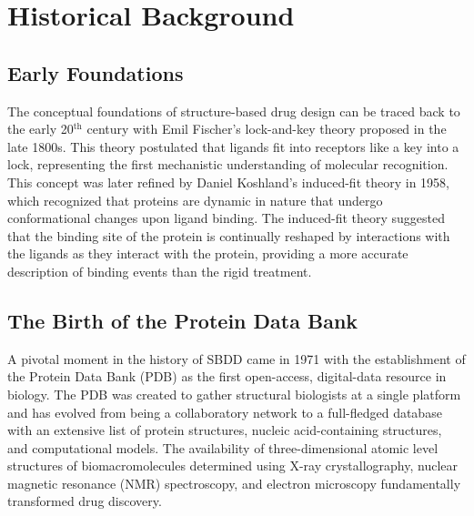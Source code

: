 \section{Historical Background}

\subsection{Early Foundations}
The conceptual foundations of structure-based drug design can be traced back to the early 20$^{\text{th}}$ century with Emil Fischer’s lock-and-key theory proposed in the late 1800s\cite{CH1_1}. This theory postulated that ligands fit into receptors like a key into a lock, representing the first mechanistic understanding of molecular recognition. This concept was later refined by Daniel Koshland’s induced-fit theory in 1958\cite{CH1_2}, which recognized that proteins are dynamic in nature that undergo conformational changes upon ligand binding. The induced-fit theory suggested that the binding site of the protein is continually reshaped by interactions with the ligands as they interact with the protein, providing a more accurate description of binding events than the rigid treatment.

\subsection{The Birth of the Protein Data Bank}
A pivotal moment in the history of SBDD came in 1971 with the establishment of the Protein Data Bank (PDB) as the first open-access, digital-data resource in biology\cite{CH1_3}. The PDB was created to gather structural biologists at a single platform and has evolved from being a collaboratory network to a full-fledged database with an extensive list of protein structures, nucleic acid-containing structures, and computational models. The availability of three-dimensional atomic level structures of biomacromolecules determined using X-ray crystallography, nuclear magnetic resonance (NMR) spectroscopy, and electron microscopy fundamentally transformed drug discovery.

